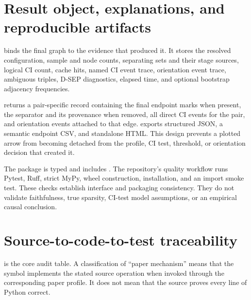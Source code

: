 \documentclass[11pt,a4paper,oneside]{report}
\begin{document}
\section{Result object, explanations, and reproducible artifacts}

 binds the final graph to the evidence that produced it.  It
stores the resolved configuration, sample and node counts, separating sets
and their stage sources, logical CI count, cache hits, named CI event trace,
orientation event trace, ambiguous triples, D-SEP diagnostics, elapsed time,
and optional bootstrap adjacency frequencies.

 returns a pair-specific record containing the final
endpoint marks when present, the separator and its provenance when removed,
all direct CI events for the pair, and orientation events attached to that
edge.   exports structured JSON, a semantic endpoint CSV,
and standalone HTML.  This design prevents a plotted arrow from becoming
detached from the profile, CI test, threshold, or orientation decision that
created it.

The package is typed and includes .  The repository's quality
workflow runs Pytest, Ruff, strict MyPy, wheel construction, installation, and
an import smoke test.  These checks establish interface and packaging
consistency.  They do not validate faithfulness, true sparsity, CI-test model
assumptions, or an empirical causal conclusion.

\section{Source-to-code-to-test traceability}

 is the core audit table.  A classification of
``paper mechanism'' means that the symbol implements the stated source
operation when invoked through the corresponding paper profile.  It does not
mean that the source proves every line of Python correct.
\end{document}
